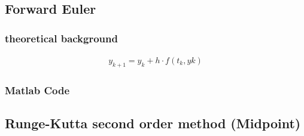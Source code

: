\subsection{Forward Euler}
\subsubsection{theoretical background}
\begin{align}
    y_{k+1}=y_k+h\cdot f(t_k, yk)
\end{align}
\subsubsection{Matlab Code}


\subsection{Runge-Kutta second order method (Midpoint)}
